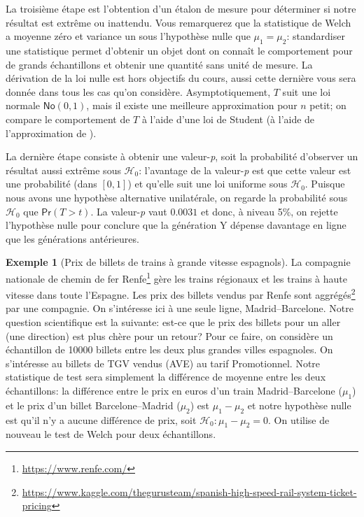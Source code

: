 \documentclass[
  11pt,
  letterpaper,
]{article}
\renewcommand{\href}[2]{#2\footnote{\url{#1}}}
\theoremstyle{definition}
\theoremstyle{definition}
\newtheorem{example}{Exemple}[section]
\theoremstyle{definition}
\theoremstyle{remark}
\begin{document}
La troisième étape est l'obtention d'un étalon de mesure pour déterminer si notre résultat est extrême ou inattendu. Vous remarquerez que la statistique de Welch a moyenne zéro et variance un sous l'hypothèse nulle que \(\mu_1=\mu_2\): standardiser une statistique permet d'obtenir un objet dont on connaît le comportement pour de grands échantillons et obtenir une quantité sans unité de mesure. La dérivation de la loi nulle est hors objectifs du cours, aussi cette dernière vous sera donnée dans tous les cas qu'on considère. Asymptotiquement, \(T\) suit une loi normale \(\mathsf{No}(0, 1)\), mais il existe une meilleure approximation pour \(n\) petit; on compare le comportement de \(T\) à l'aide d'une loi de Student (à l'aide de l'approximation de \citet{Satterthwaite1946}).

La dernière étape consiste à obtenir une valeur-\emph{p}, soit la probabilité d'observer un résultat aussi extrême sous \(\mathscr{H}_0\): l'avantage de la valeur-\emph{p} est que cette valeur est une probabilité (dans \([0, 1]\)) et qu'elle suit une loi uniforme sous \(\mathscr{H}_0\). Puisque nous avons une hypothèse alternative unilatérale, on regarde la probabilité sous \(\mathscr{H}_0\) que \(\mathsf{Pr}(T > t)\). La valeur-\emph{p} vaut \(0.0031\) et donc, à niveau 5\%, on rejette l'hypothèse nulle pour conclure que la génération Y dépense davantage en ligne que les générations antérieures.

\begin{example}[Prix de billets de trains à grande vitesse espagnols]
\protect\hypertarget{exm:prix-trains-tests}{}{\label{exm:prix-trains-tests} {} }La compagnie nationale de chemin de fer \href{https://www.renfe.com/}{Renfe} gère les trains régionaux et les trains à haute vitesse dans toute l'Espagne. Les prix des billets vendus par Renfe sont \href{https://www.kaggle.com/thegurusteam/spanish-high-speed-rail-system-ticket-pricing}{aggrégés} par une compagnie. On s'intéresse ici à une seule ligne, Madrid--Barcelone. Notre question scientifique est la suivante: est-ce que le prix des billets pour un aller (une direction) est plus chère pour un retour? Pour ce faire, on considère un échantillon de 10000 billets entre les deux plus grandes villes espagnoles. On s'intéresse au billets de TGV vendus (AVE) au tarif Promotionnel. Notre statistique de test sera simplement la différence de moyenne entre les deux échantillons: la différence entre le prix en euros d'un train Madrid--Barcelone (\(\mu_1\)) et le prix d'un billet Barcelone--Madrid (\(\mu_2\)) est \(\mu_1-\mu_2\) et notre hypothèse nulle est qu'il n'y a aucune différence de prix, soit \(\mathscr{H}_0: \mu_1-\mu_2=0\). On utilise de nouveau le test de Welch pour deux échantillons.
\end{example}
\end{document}
